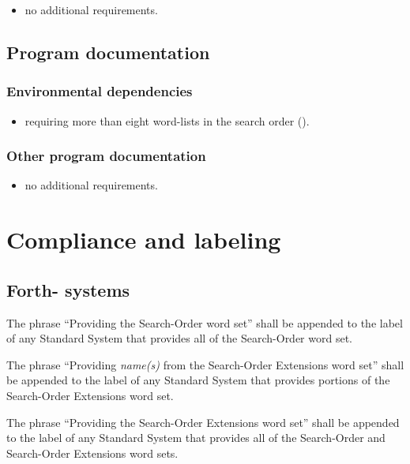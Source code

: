 \begin{itemize}
\item no additional requirements.
\end{itemize}

\subsection{Program documentation} %

\subsubsection{Environmental dependencies} %

\begin{itemize}
\item requiring more than eight word-lists in the search order
	().
\end{itemize}

\subsubsection{Other program documentation} %

\begin{itemize}
\item no additional requirements.
\end{itemize}


\section{Compliance and labeling} %

\subsection{Forth-\snapshot{} systems} %

The phrase ``Providing the Search-Order word set'' shall be
appended to the label of any Standard System that provides all of
the Search-Order word set.

The phrase ``Providing \emph{name(s)} from the Search-Order
Extensions word set'' shall be appended to the label of any
Standard System that provides portions of the Search-Order
Extensions word set.

The phrase ``Providing the Search-Order Extensions word set'' shall
be appended to the label of any Standard System that provides all of
the Search-Order and Search-Order Extensions word sets.


